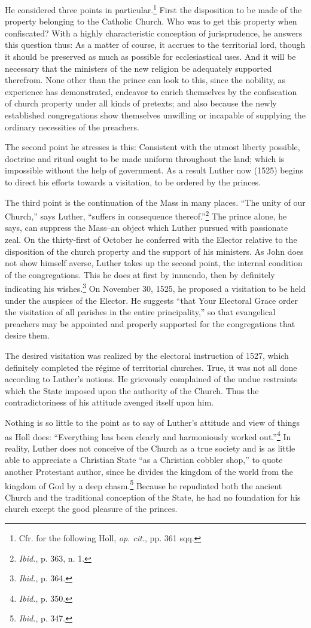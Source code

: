 He considered three points in particular.\footnote{Cfr. for the following Holl, \textit{op. cit.}, pp. 361 sqq.}
First the disposition to be made
of the property belonging to the Catholic Church. Who was to get this
property when confiscated? With a highly characteristic conception of jurisprudence,
he answers this question thus: As a matter of course, it accrues to
the territorial lord, though it should be preserved as much as possible for
ecclesiastical uses. And it will be necessary that the ministers of the new
religion be adequately supported therefrom. None other than the prince can
look to this, since the nobility, as experience has demonstrated, endeavor to
enrich themselves by the confiscation of church property under all kinds
of pretexts; and also because the newly established congregations show themselves
unwilling or incapable of supplying the ordinary necessities of the
preachers.

The second point he stresses is this: Consistent with the utmost liberty
possible, doctrine and ritual ought to be made uniform throughout the land;
which is impossible without the help of government. As a result Luther now
(1525) begins to direct his efforts towards a visitation, to be ordered by the
princes.

The third point is the continuation of the Mass in many places. “The
unity of our Church,” says Luther, “suffers in consequence thereof.”\footnote{\textit{Ibid.}, p. 363, n. 1.}
The prince alone, he says, can suppress the Mass--an object which
Luther pursued with passionate zeal.
On the thirty-first of October he conferred with the Elector relative to
the disposition of the church property and the support of his ministers. As
John does not show himself averse, Luther takes up the second point, the
internal condition of the congregations. This he does at first by innuendo,
then by definitely indicating his wishes.\footnote{\textit{Ibid.}, p. 364.}
On November 30, 1525, he proposed
a visitation to be held under the auspices of the Elector. He suggests
“that Your Electoral Grace order the visitation of all parishes in the entire
principality,” so that evangelical preachers may be appointed and properly
supported for the congregations that desire them.

The desired visitation was realized by the electoral instruction of
1527, which definitely completed the régime of territorial churches.
True, it was not all done according to Luther’s notions. He grievously
complained of the undue restraints which the State imposed upon
the authority of the Church. Thus the contradictoriness of his attitude
avenged itself upon him.

Nothing is so little to the point as to say of Luther’s attitude
and view of things as Holl does: “Everything has been clearly and
harmoniously worked out.”\footnote{\textit{Ibid.}, p. 350.}
In reality, Luther does not conceive
of the Church as a true society and is as little able to appreciate a
Christian State “as a Christian cobbler shop,” to quote another
Protestant author, since he divides the kingdom of the world from
the kingdom of God by a deep chasm.\footnote{\textit{Ibid.}, p. 347.}
Because he repudiated
both the ancient Church and the traditional conception of the State,
he had no foundation for his church except the good pleasure of the
princes.
